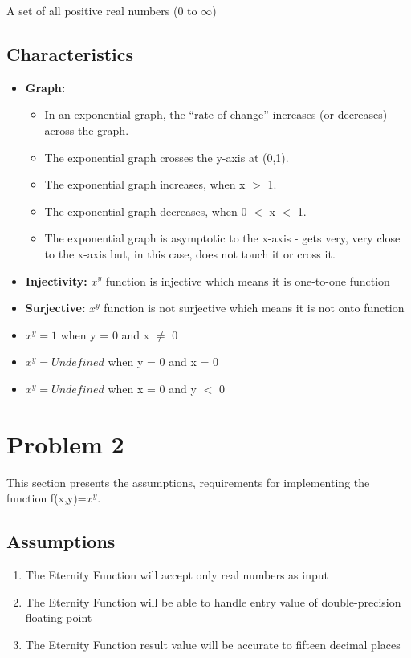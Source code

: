 \documentclass[11pt, english]{report}
\begin{document}
A set of all positive real numbers\cite{mathbits} (0 to \(\infty\))

\section{Characteristics}

\begin{itemize}
    \item \textbf{Graph: }
    \begin{itemize}
        \item In an exponential graph, the ``rate of change'' increases (or decreases) across the graph.
        \item The exponential graph crosses the y-axis at (0,1).
        \item The exponential graph increases, when x \(>\) 1.
        \item The exponential graph decreases, when 0 \(<\) x \(<\) 1.
        \item The exponential graph is asymptotic to the x-axis - gets very, very close to the x-axis but, in this case, does not touch it or cross it.
    \end{itemize}
    \item \textbf{Injectivity:} \(x^y\) function is injective which means it is one-to-one function
    \item \textbf{Surjective:} \(x^y\) function is not surjective which means it is not onto function
    \item \(x^y=1\) when y = 0  and x \(\neq\) 0 
    \item \(x^y= Undefined\) when y = 0 and x = 0 
    \item \(x^y= Undefined\) when x = 0 and y \(<\) 0  
\end{itemize}

\chapter{Problem 2}

This section presents the assumptions, requirements for implementing the function f(x,y)=\(x^y\).

\section{Assumptions}

\begin{enumerate}
    \item The Eternity Function will accept only real numbers as input
    \item The Eternity Function will be able to handle entry value of double-precision floating-point
    \item The Eternity Function result value will be accurate to fifteen decimal places
\end{enumerate}
\end{document}
